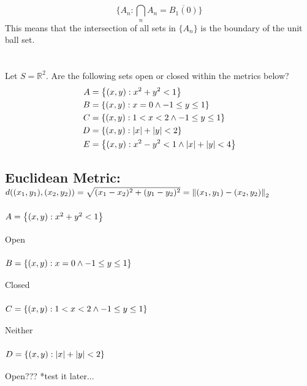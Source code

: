 \documentclass[]{article}
\newcommand{\R}{\mathbb{R}}
\begin{document}
$$\{A_n : \bigcap_n A_n = \overline{B_1(0)}\}$$
This means that the intersection of all sets in $\{A_n\}$ 
is the boundary of the unit ball set.




















\newpage
\section{}
Let $S = \R^2$. Are the following sets open or closed within the metrics below?
\begin{align*}
    A &= \qty{(x,y) : x^2 + y^2 < 1}\\
    B &= \qty{(x,y) : x = 0 \land -1 \leq y \leq 1}\\
    C &= \qty{(x,y) : 1 < x < 2 \land -1 \leq y \leq 1}\\
    D &= \qty{(x,y) : \abs{x} + \abs{y} < 2}\\
    E &= \qty{(x,y) : x^2 - y^2 < 1 \land \abs{x} + \abs{y} < 4}
\end{align*}

\subsection{Euclidean Metric: 
$d((x_1,y_1),(x_2,y_2)) = \sqrt{(x_1-x_2)^2 + (y_1-y_2)^2} = \norm{(x_1,y_1)-(x_2,y_2)}_2$
}
\subsubsection{$A = \qty{(x,y) : x^2 + y^2 < 1}$}
Open
\subsubsection{$B = \qty{(x,y) : x = 0 \land -1 \leq y \leq 1}$}
Closed
\subsubsection{$C = \qty{(x,y) : 1 < x < 2 \land -1 \leq y \leq 1}$}
Neither
\subsubsection{$D = \qty{(x,y) : \abs{x} + \abs{y} < 2}$}
Open??? *test it later...
\end{document}
